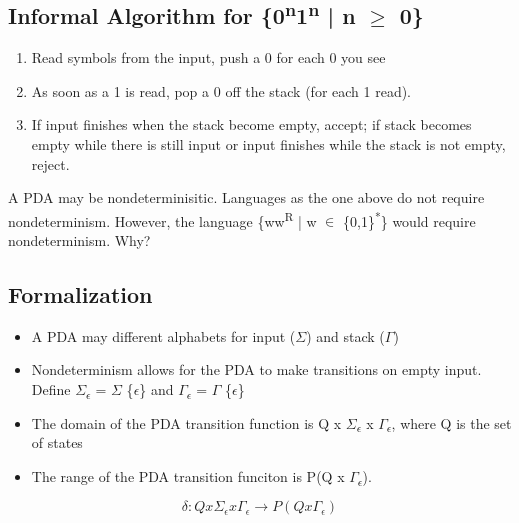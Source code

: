 \documentclass[11pt]{article}
\begin{document}
\subsection{Informal Algorithm for \{0\textsuperscript{n}1\textsuperscript{n} | n \(\ge\) 0\}}
\label{sec:org4072a82}
\begin{enumerate}
\item Read symbols from the input, push a 0 for each 0 you see\\
\item As soon as a 1 is read, pop a 0 off the stack (for each 1 read).\\
\item If input finishes when the stack become empty, accept; if stack becomes empty while there is still input or input finishes while the stack is not empty, reject.\\
\end{enumerate}

A PDA may be nondeterminisitic. Languages as the one above do not require nondeterminism. However, the language \{ww\textsuperscript{R} | w \(\in\) \{0,1\}\textsuperscript{*}\} would require nondeterminism. Why?\\
\subsection{Formalization}
\label{sec:orgd64be42}
\begin{itemize}
\item A PDA may different alphabets for input (\(\Sigma\)) and stack (\(\Gamma\))\\
\item Nondeterminism allows for the PDA to make transitions on empty input. Define \(\Sigma\)\textsubscript{\(\epsilon\)} = \(\Sigma\) \union \{\(\epsilon\)\} and \(\Gamma\)\textsubscript{\(\epsilon\)} = \(\Gamma\) \union{} \{\(\epsilon\)\}\\
\item The domain of the PDA transition function is Q x \(\Sigma\)\textsubscript{\(\epsilon\)} x \(\Gamma\)\textsubscript{\(\epsilon\)}, where Q is the set of states\\
\item The range of the PDA transition funciton is P(Q x \(\Gamma\)\textsubscript{\(\epsilon\)}).\\
\end{itemize}
\[
\delta{}: Q x \Sigma{}_{\epsilon{}} x \Gamma{}_{\epsilon} \rightarrow{} P(Q x \Gamma{}_{\epsilon})
\]\\
\end{document}
